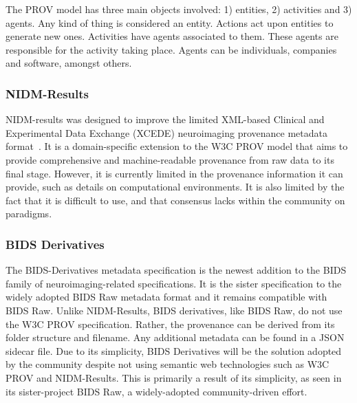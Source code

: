             The PROV model has three main objects involved: 1) entities, 2)
            activities and 3) agents. Any kind of thing is considered an entity.
            Actions act upon entities to generate new ones. Activities have
            agents associated to them. These agents are responsible for the
            activity taking place. Agents can be individuals, companies and
            software, amongst others.
            
            \subsubsection{NIDM-Results}
                NIDM-results was designed to improve the limited XML-based
                Clinical and Experimental Data Exchange (XCEDE) neuroimaging
                provenance metadata format~\cite{Maumet:2016aa}. It is a
                domain-specific extension to the W3C PROV model that aims to
                provide comprehensive and machine-readable provenance from raw
                data to its final stage.
                However, it is currently limited in the provenance information
                it can provide, such as details on computational environments.
                It is also limited by the fact that it is difficult to use, and
                that consensus lacks within the community on paradigms.

            \subsubsection{BIDS Derivatives}
                The BIDS-Derivatives metadata specification is the newest
                addition to the BIDS family of neuroimaging-related
                specifications. It is the sister specification to the widely
                adopted BIDS Raw metadata format and it remains compatible with
                BIDS Raw. Unlike NIDM-Results, BIDS derivatives, like BIDS Raw,
                do not use the W3C PROV specification. Rather, the provenance
                can be derived from its folder structure and filename. Any
                additional metadata can be found in a JSON sidecar file. Due to
                its simplicity, BIDS Derivatives will be the solution adopted by
                the community despite not using semantic web technologies such
                as W3C PROV and NIDM-Results. This is primarily a result of its
                simplicity, as seen in its sister-project BIDS Raw, a
                widely-adopted community-driven effort.
            
